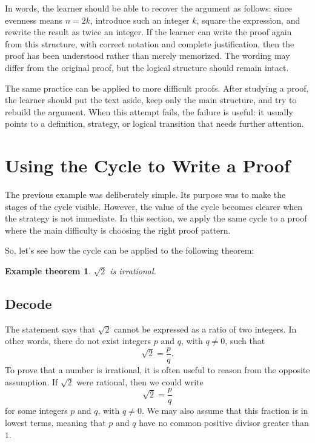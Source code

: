 \documentclass[11pt,a4paper]{article}
\newtheorem*{exampletheorem}{Example theorem}
\begin{document}
In words, the learner should be able to recover the argument as follows: since evenness means \(n = 2k\), introduce such an integer \(k\), square the expression, and rewrite the result as twice an integer. If the learner can write the proof again from this structure, with correct notation and complete justification, then the proof has been understood rather than merely memorized. The wording may differ from the original proof, but the logical structure should remain intact.

The same practice can be applied to more difficult proofs. After studying a proof, the learner should put the text aside, keep only the main structure, and try to rebuild the argument. When this attempt fails, the failure is useful: it usually points to a definition, strategy, or logical transition that needs further attention.

\section{Using the Cycle to Write a Proof}

The previous example was deliberately simple. Its purpose was to make the stages of the cycle visible. However, the value of the cycle becomes clearer when the strategy is not immediate. In this section, we apply the same cycle to a proof where the main difficulty is choosing the right proof pattern.

So, let's see how the cycle can be applied to the following theorem:

\begin{exampletheorem}
\(\sqrt{2}\) is irrational.
\end{exampletheorem}

\subsection{Decode}

The statement says that \(\sqrt{2}\) cannot be expressed as a ratio of two integers. In other words, there do not exist integers \(p\) and \(q\), with \(q \neq 0\), such that
\[
    \sqrt{2} = \frac{p}{q}.
\]
To prove that a number is irrational, it is often useful to reason from the opposite assumption. If \(\sqrt{2}\) were rational, then we could write
\[
    \sqrt{2} = \frac{p}{q}
\]
for some integers \(p\) and \(q\), with \(q \neq 0\). We may also assume that this fraction is in lowest terms, meaning that \(p\) and \(q\) have no common positive divisor greater than \(1\).
\end{document}
